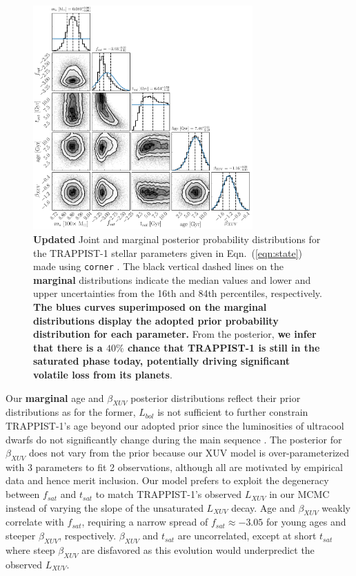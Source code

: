 \documentclass[twocolumn]{aastex62}
\newcommand{\xxx}[1]{{\textbf{#1}}}
\begin{document}
\begin{figure}[t]
\centering
	\includegraphics[width=0.75\textwidth]{../Analysis/Corner/trappist1Corner.pdf}
   \caption{\xxx{Updated} Joint and marginal posterior probability distributions for the TRAPPIST-1 stellar parameters given in Eqn.~(\ref{eqn:state}) made using \texttt{corner} \citep{ForemanMackey2016}. The black vertical dashed lines on the \xxx{marginal} distributions indicate the median values and lower and upper uncertainties from the 16th and 84th percentiles, respectively. \xxx{The blues curves superimposed on the marginal distributions display the adopted prior probability distribution for each parameter.} From the posterior, \xxx{we infer that there is a $40\%$ chance that TRAPPIST-1 is still in the saturated phase today, potentially driving significant volatile loss from its planets}.}%
    \label{fig:corner}%
\end{figure}

Our \xxx{marginal} age and $\beta_{XUV}$ posterior distributions reflect their prior distributions as for the former, $L_{bol}$ is not sufficient to further constrain TRAPPIST-1's age beyond our adopted prior since the luminosities of ultracool dwarfs do not significantly change during the main sequence \citep{Baraffe2015}. The posterior for $\beta_{XUV}$ does not vary from the prior because our XUV model is over-parameterized with 3 parameters to fit 2 observations, although all are motivated by empirical data and hence merit inclusion. Our model prefers to exploit the degeneracy between $f_{sat}$ and $t_{sat}$ to match TRAPPIST-1's observed $L_{XUV}$ in our MCMC instead of varying the slope of the unsaturated $L_{XUV}$ decay. Age and $\beta_{XUV}$ weakly correlate with $f_{sat}$, requiring a narrow spread of $f_{sat} \approx -3.05$ for young ages and steeper $\beta_{XUV}$, respectively. $\beta_{XUV}$ and $t_{sat}$ are uncorrelated, except at short $t_{sat}$ where steep $\beta_{XUV}$ are disfavored as this evolution would underpredict the observed $L_{XUV}$.
\end{document}
